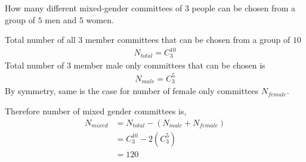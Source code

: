

\question[4] How many different mixed-gender committees of 3 people can be chosen from a group of $5$ men and $5$ women.


\ifprintanswers
\fi 

\begin{solution}[\halfpage]
  Total number of all $3$ member committees that can be chosen from a group of $10$
  \begin{align}
    N_{total} = C^{10}_3 \nonumber
  \end{align}
  Total number of $3$ member male only committees that can be chosen is
  \begin{align}
    N_{male} = C^{5}_3 \nonumber
  \end{align}
  By symmetry, same is the case for number of female only committees $N_{female}$.
  
  Therefore number of mixed gender committees is,
  \begin{align}
    N_{mixed} &= N_{total} - (N_{male}+N_{female}) \nonumber \\
              &= C^{10}_3 - 2(C^5_3) \nonumber \\
              &= 120 \nonumber
  \end{align}
\end{solution}

